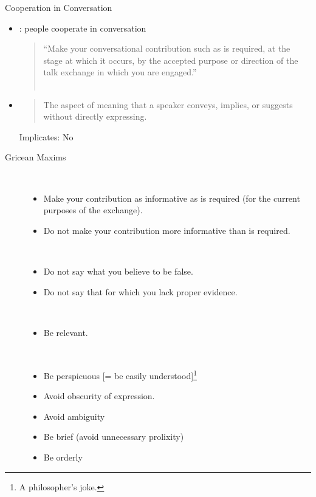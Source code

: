 \documentclass{beamer}
\begin{document}
\begin{frame}{Cooperation in Conversation}
\MyLogo{}
\begin{itemize}
\item {}: people cooperate in conversation
  \begin{quote}
    ``Make your conversational contribution such as is required, at the stage at which it occurs, by the accepted purpose or direction of the talk exchange in which you are engaged.''
    \\ ~ \hfill  \citet{Grice:1975}
  \end{quote}
\item {}
  \begin{quote}
    The aspect of meaning that a speaker conveys, implies, or suggests
    without directly expressing.
  \end{quote}
  \begin{exe}
    \ex {}
    \ex {}
    \trans \textnormal{Implicates: No}
  \end{exe}

\end{itemize}

\end{frame}

\begin{frame}[allowframebreaks]{Gricean Maxims}
\begin{description}
\item [] ~
  \begin{itemize}
  \item Make your contribution as informative as is required (for the current purposes of the exchange).
  \item Do not make your contribution more informative than is required.
  \end{itemize}
\item [] ~
  \begin{itemize}
  \item Do not say what you believe to be false.
  \item Do not say that for which you lack proper evidence.
  \end{itemize}
\framebreak
\item [] ~
  \begin{itemize}
  \item Be relevant.
  \end{itemize}
\item [] ~
  \begin{itemize}
  \item Be perspicuous [= be easily understood]\footnote{A
      philosopher's joke.}
  \item Avoid obscurity of expression.
  \item Avoid ambiguity
  \item Be brief (avoid unnecessary prolixity)
  \item Be orderly
  \end{itemize}
\end{description}

\end{frame}
\end{document}
